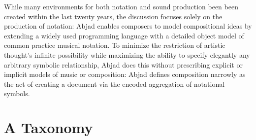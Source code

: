 \documentclass{article}
\begin{document}
While many environments for both notation and sound production been been
created within the last twenty years, the discussion focuses solely on the
production of notation: Abjad enables composers to model compositional ideas by
extending a widely used programming language with a detailed object model of
common practice musical notation. To minimize the restriction of artistic
thought's infinite possibility while maximizing the ability to specify
elegantly any arbitrary symbolic relationship, Abjad does this without
prescribing explicit or implicit models of music or composition: Abjad defines
composition narrowly as the act of creating a document via the encoded
aggregation of notational symbols.

\section{A Taxonomy} \label{sec:taxonomy}
\end{document}
